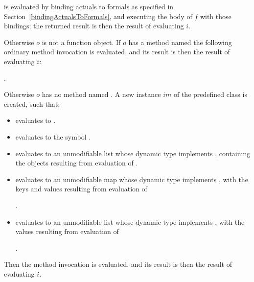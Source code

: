 \documentclass[makeidx]{article}
\begin{document}
{\noindent
is evaluated by binding actuals to formals as specified in Section~\ref{bindingActualsToFormals},
and executing the body of $f$ with those bindings;
the returned result is then the result of evaluating $i$.

\LMHash{}%
Otherwise $o$ is not a function object.
If $o$ has a method named \CALL{}
the following ordinary method invocation is evaluated,
and its result is then the result of evaluating $i$:

\noindent
{}.

\LMHash{}%
Otherwise $o$ has no method named \CALL{}.
A new instance $im$ of the predefined class  is created, such that:
\begin{itemize}
\item {} evaluates to \TRUE.
\item {} evaluates to the symbol .
\item {} evaluates to an unmodifiable list
  whose dynamic type implements ,
  containing the objects resulting from evaluation of
  .
\item {} evaluates to an unmodifiable map
  whose dynamic type implements ,
  with the keys and values resulting from evaluation of

  .
\item {} evaluates to an unmodifiable list
  whose dynamic type implements ,
  with the values resulting from evaluation of

  .
\end{itemize}

\LMHash{}%
Then the method invocation  is evaluated,
and its result is then the result of evaluating $i$.



}
\end{document}
